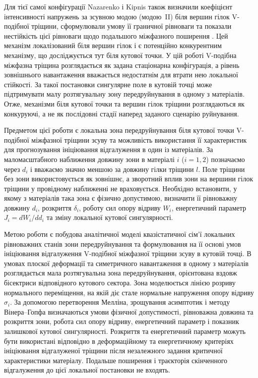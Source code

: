 Для тієї самої конфігурації Nazarenko і Kipnis також визначили коефіцієнт
інтенсивності напружень за зсувною модою (модою~II) біля вершин гілок
V-подібної
тріщини, сформулювали умову її граничної рівноваги та показали нестійкість
цієї рівноваги щодо подальшого міжфазного поширення
\cite{NazarenkoKipnis2022Equilibrium}. Цей механізм локалізований біля
вершин гілок і є потенційно конкурентним механізму, що досліджується
тут біля кутової точки. У цій роботі V-подібна міжфазна тріщина
розглядається як задана стаціонарна конфігурація, а рівень зовнішнього
навантаження вважається недостатнім для втрати нею локальної стійкості.
За такої постановки сингулярне поле в кутовій точці може підтримувати
малу розтягувальну зону передруйнування в одному з матеріалів. Отже,
механізми біля кутової точки та вершин гілок тріщини розглядаються як
конкуруючі, а не як послідовні стадії наперед заданого сценарію
руйнування.

Предметом цієї роботи є локальна зона передруйнування біля кутової точки
V-подібної міжфазної тріщини зсуву та можливість використання її
характеристик для прогнозування ініціювання відгалуження в один із
матеріалів. За маломасштабного наближення довжину зони в матеріалі $i$
($i=1,2$) позначаємо через $d_i$ і вважаємо значно меншою за довжину
гілки тріщини $l$. Поле тріщини без зони використовується як зовнішнє, а
зворотний вплив зони на вершини гілок тріщини у провідному наближенні
не враховується. Необхідно встановити, у якому з матеріалів така зона є
фізично допустимою, визначити її рівноважну довжину $d_i$, розкриття
$\delta_i$, роботу сил опору відриву $W_i$, енергетичний параметр
$J_i=dW_i/dd_i$ та зміну локальної кутової сингулярності.

Метою роботи є побудова аналітичної моделі квазістатичної сім'ї локальних
рівноважних станів зони передруйнування та формулювання на її основі умов
ініціювання відгалуження V-подібної міжфазної тріщини зсуву в кутовій
точці. В умовах плоскої деформації та симетричного навантаження в одному з
матеріалів розглядається мала розтягувальна зона передруйнування,
орієнтована вздовж бісектриси відповідного кутового сектора. Зона
моделюється лінією розриву нормального переміщення, на якій діє стале
нормальне напруження опору відриву $\sigma_i$. За допомогою перетворення Мелліна,
зрощування асимптотик і методу Вінера--Гопфа визначаються умови фізичної
допустимості, рівноважна довжина та розкриття зони, робота сил опору
відриву, енергетичний параметр і показник залишкової кутової
сингулярності. Розкриття та енергетичний параметр можуть бути використані
відповідно в деформаційному та енергетичному критеріях ініціювання
відгалуженої тріщини після незалежного задання критичної характеристики
матеріалу. Подальше поширення і траєкторія скінченного відгалуження до
цієї локальної постановки не входять.

